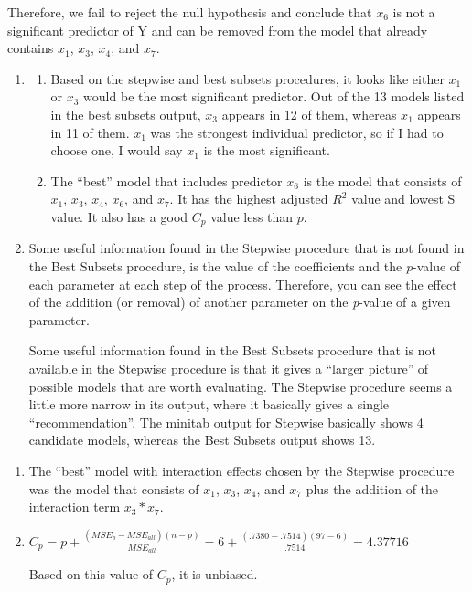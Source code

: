 \documentclass{article}
\providecommand{\tightlist}{%
      \setlength{\itemsep}{0pt}\setlength{\parskip}{0pt}}
\begin{document}
\begin{enumerate}
Therefore, we fail to reject the null hypothesis and conclude that
\(x_6\) is not a significant predictor of Y and can be removed from the
model that already contains \(x_1\), \(x_3\), \(x_4\), and \(x_7\).
\end{enumerate}

\begin{enumerate}
\def\labelenumi{\alph{enumi})}
\setcounter{enumi}{4}
\item
  \begin{enumerate}
  \def\labelenumii{\roman{enumii}.}
  \tightlist
  \item
    Based on the stepwise and best subsets procedures, it looks like
    either \(x_1\) or \(x_3\) would be the most significant predictor.
    Out of the 13 models listed in the best subsets output, \(x_3\)
    appears in 12 of them, whereas \(x_1\) appears in 11 of them.
    \(x_1\) was the strongest individual predictor, so if I had to
    choose one, I would say \(x_1\) is the most significant.
  \item
    The ``best'' model that includes predictor \(x_6\) is the model that
    consists of \(x_1\), \(x_3\), \(x_4\), \(x_6\), and \(x_7\). It has
    the highest adjusted \(R^2\) value and lowest S value. It also has a
    good \(C_p\) value less than \(p\).
  \end{enumerate}
  \newpage
\item
  Some useful information found in the Stepwise procedure that is not
  found in the Best Subsets procedure, is the value of the coefficients
  and the \emph{p}-value of each parameter at each step of the process.
  Therefore, you can see the effect of the addition (or removal) of
  another parameter on the \emph{p}-value of a given parameter.

  Some useful information found in the Best Subsets procedure that is not
available in the Stepwise procedure is that it gives a ``larger
picture'' of possible models that are worth evaluating. The Stepwise
procedure seems a little more narrow in its output, where it basically
gives a single ``recommendation''. The minitab output for Stepwise
basically shows 4 candidate models, whereas the Best Subsets output
shows 13.
\end{enumerate}

\begin{enumerate}
\def\labelenumi{\alph{enumi})}
\setcounter{enumi}{6}
\item
  The ``best'' model with interaction effects chosen by the Stepwise
  procedure was the model that consists of \(x_1\), \(x_3\), \(x_4\),
  and \(x_7\) plus the addition of the interaction term \(x_3*x_7\).
\item
  \(C_p = p + \frac{(MSE_p - MSE_{all})(n - p)}{MSE_{all}} = 6 + \frac{(.7380 - .7514)(97 - 6)}{.7514} = 4.37716\)
  
  Based on this value of \(C_p\), it is unbiased.
\end{enumerate}
\end{document}
